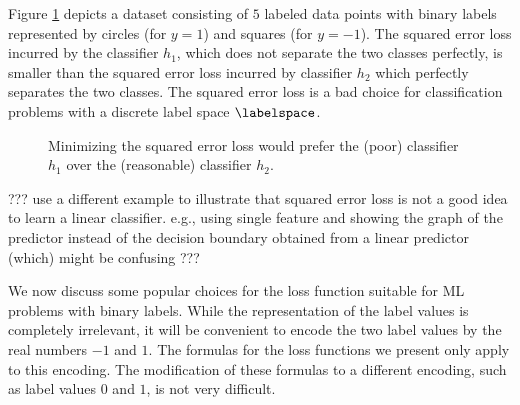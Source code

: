 \documentclass[12pt]{report}
\begin{document}
Figure \ref{fig_squarederrornotgoodclass} depicts a dataset 
consisting of $5$ labeled data points with binary labels represented 
by circles (for $y=1$) and squares (for $y=-1$). The squared error loss 
incurred by the classifier $h_{1}$, which does not separate the two 
classes perfectly, is smaller than the squared error loss incurred 
by classifier $h_{2}$ which perfectly separates the two classes. 
The squared error loss is a bad choice for classification problems 
with a discrete label space $\labelspace$. 
\begin{figure}[htbp]
\begin{center}
\caption{Minimizing the squared error loss would prefer the (poor) classifier $h_{1}$ 
	over the (reasonable) classifier $h_2$.}
\label{fig_squarederrornotgoodclass}
\end{center}
\end{figure}

??? use a different example to illustrate that squared error loss is not a good 
idea to learn a linear classifier. e.g., using single feature and showing the graph 
of the predictor instead of the decision boundary obtained from a linear predictor 
(which) might be confusing ??? 

We now discuss some popular choices for the loss function 
suitable for ML problems with binary labels. While the representation 
of the label values is completely irrelevant, it will be convenient to 
encode the two label values by the real numbers $-1$ and $1$. 
The formulas for the loss functions we present only apply to 
this encoding. The modification of these formulas to a different 
encoding, such as label values $0$ and $1$, is not very difficult. 
\end{document}
